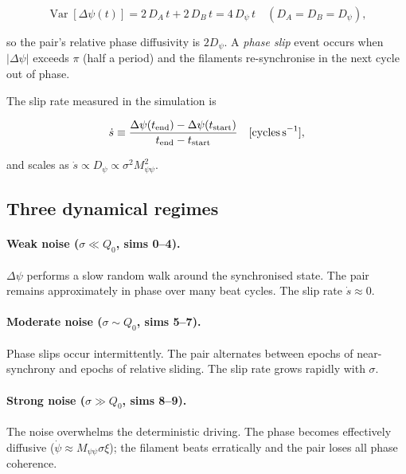 \documentclass[11pt,a4paper]{article}
\begin{document}
\begin{equation}
  \operatorname{Var}[\Delta\psi(t)] = 2\,D_A\,t + 2\,D_B\,t = 4\,D_\psi\,t
  \quad (D_A = D_B = D_\psi),
\end{equation}

so the pair's relative phase diffusivity is $2D_\psi$.  A \emph{phase slip}
event occurs when $|\Delta\psi|$ exceeds $\pi$ (half a period) and the
filaments re-synchronise in the next cycle out of phase.

The slip rate measured in the simulation is

\begin{equation}
  \dot s \equiv \frac{\Delta\psi(t_\mathrm{end}) - \Delta\psi(t_\mathrm{start})}
                     {t_\mathrm{end} - t_\mathrm{start}}
  \quad [\text{cycles\,s}^{-1}],
\end{equation}

and scales as $\dot s \propto D_\psi \propto \sigma^2 M_{\psi\psi}^2$.

\subsection{Three dynamical regimes}

\paragraph{Weak noise ($\sigma \ll Q_0$, sims 0--4).}
$\Delta\psi$ performs a slow random walk around the synchronised state.
The pair remains approximately in phase over many beat cycles.  The slip rate
$\dot s \approx 0$.

\paragraph{Moderate noise ($\sigma \sim Q_0$, sims 5--7).}
Phase slips occur intermittently.  The pair alternates between epochs of
near-synchrony and epochs of relative sliding.  The slip rate grows rapidly
with $\sigma$.

\paragraph{Strong noise ($\sigma \gg Q_0$, sims 8--9).}
The noise overwhelms the deterministic driving.  The phase becomes
effectively diffusive ($\dot\psi \approx M_{\psi\psi}\sigma\xi$); the
filament beats erratically and the pair loses all phase coherence.

\end{document}
